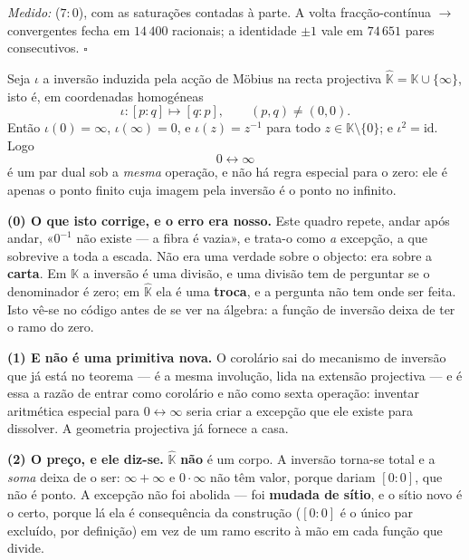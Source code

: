 \documentclass[livro.tex]{subfiles}
\begin{document}
\begin{teorema}
\emph{Medido:}  ($7{:}0$), com as saturações
contadas à parte. A volta fracção-contínua $\to$ convergentes fecha em
$14\,400$ racionais; a identidade $\pm1$ vale em $74\,651$ pares
consecutivos. $\square$
\end{teorema}

\begin{corolario}\label{cor:zero-infinito}
Seja $\iota$ a inversão induzida pela acção de Möbius na recta
projectiva $\widehat{\mathbb{K}}=\mathbb{K}\cup\{\infty\}$, isto é, em
coordenadas homogéneas
\[
\iota:[p:q]\longmapsto[q:p],\qquad (p,q)\neq(0,0).
\]
Então $\iota(0)=\infty$, $\iota(\infty)=0$, e $\iota(z)=z^{-1}$ para todo
$z\in\mathbb{K}\setminus\{0\}$; e $\iota^{2}=\mathrm{id}$. Logo
\[
\boxed{\;0\longleftrightarrow\infty\;}
\]
é um par dual sob a \emph{mesma} operação, e não há regra especial para o
zero: ele é apenas o ponto finito cuja imagem pela inversão é o ponto no
infinito.

\textbf{(0) O que isto corrige, e o erro era nosso.} Este quadro repete,
andar após andar, «$0^{-1}$ não existe --- a fibra é vazia», e trata-o
como \emph{a} excepção, a que sobrevive a toda a escada. Não era uma
verdade sobre o objecto: era sobre a \textbf{carta}. Em $\mathbb{K}$ a
inversão é uma divisão, e uma divisão tem de perguntar se o denominador é
zero; em $\widehat{\mathbb{K}}$ ela é uma \textbf{troca}, e a pergunta
não tem onde ser feita. Isto vê-se no código antes de se ver na álgebra:
a função de inversão deixa de ter o ramo do zero.

\textbf{(1) E não é uma primitiva nova.} O corolário sai do mecanismo de
inversão que já está no teorema --- é a mesma involução, lida na
extensão projectiva --- e é essa a razão de entrar como corolário e não
como sexta operação: inventar aritmética especial para
$0\leftrightarrow\infty$ seria criar a excepção que ele existe para
dissolver. A geometria projectiva já fornece a casa.

\textbf{(2) O preço, e ele diz-se.} $\widehat{\mathbb{K}}$ \textbf{não} é
um corpo. A inversão torna-se total e a \emph{soma} deixa de o ser:
$\infty+\infty$ e $0\cdot\infty$ não têm valor, porque dariam $[0:0]$,
que não é ponto. A excepção não foi abolida --- foi \textbf{mudada de
sítio}, e o sítio novo é o certo, porque lá ela é consequência da
construção ($[0:0]$ é o único par excluído, por definição) em vez de um
ramo escrito à mão em cada função que divide.


\end{corolario}
\end{document}
